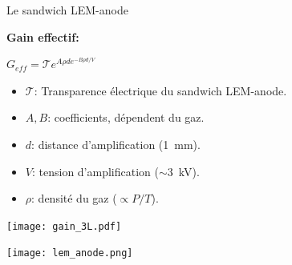     \begin{frame}{Le sandwich LEM-anode}
	   		\begin{minipage}{0.48\textwidth}
	   			\begin{scriptsize}
		   			\textbf{Gain effectif:}\\
		   		\end{scriptsize}
	   			$G_{eff} = \mathcal{T}e^{A\rho d e^{-B\rho d/V}}$\\
	   			\begin{scriptsize}
	    			\begin{itemize}
	    				\item $\mathcal{T}$: Transparence électrique du sandwich LEM-anode.
	    				\item $A,B$: coefficients, dépendent du gaz.
	    				\item $d$: distance d'amplification (\SI{1}{\milli\meter}).
	    				\item $V$: tension d'amplification ($\sim$\SI{3}{\kilo\volt}).
	    				\item $\rho$: densité du gaz ($\propto P/T$).
	    			\end{itemize}
	    		\end{scriptsize} 
	   			\vfill
                \centering
				\texttt{[image: gain\_3L.pdf]}
	   		\end{minipage}\hfill
	   		\begin{minipage}{0.48\textwidth}
	   			\texttt{[image: lem\_anode.png]}
	   		\end{minipage}
    \end{frame}

